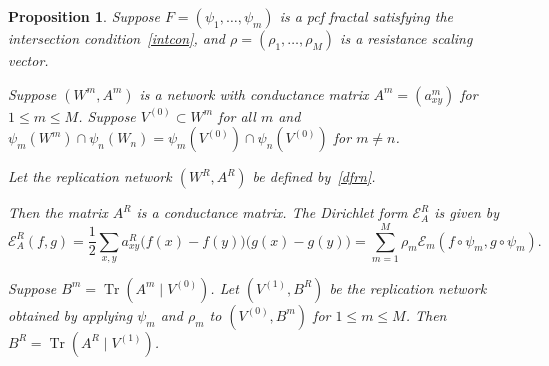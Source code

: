 \documentclass[a4paper]{amsart}
\theoremstyle{plain}
\newtheorem{proposition}[theorem]{Proposition}
\theoremstyle{definition}
\theoremstyle{remark}
\DeclareMathOperator{\Tr}{Tr}
\begin{document}
\begin{proposition} \label{proptr} Suppose $ F =(\psi_1,\dots, \psi_m) $ is a pcf fractal satisfying the intersection condition~\eqref{intcon}, and $ \rho = (\rho_1,\dots,\rho_M) $ is a resistance scaling vector.

Suppose   $ (W^m,A^m) $ is a network with conductance matrix $ A^m = (a^m_{xy}) $ for $ 1 \leq m \leq M $.
Suppose   $ V^{(0)} \subset W^m $ for all $ m $ and  $ \psi  _m (W^m) \cap \psi  _n (W_n) =  \psi  _m (V^{(0)}) \cap \psi  _n (V^{(0)}) $ for $ m\neq n $.
 
Let the replication network $ (W^R, A^R ) $ be defined  by~\eqref{dfrn}. 
 
Then the matrix $ A^R $ is a conductance matrix.  
The  Dirichlet form $ \mathcal{E}_A ^R $ is given by 
\begin{equation} \label{repm}
\mathcal{E} _A^R  (f,g)= \frac{1}{2} \sum_{x,y} a_{xy}^R\big(f(x) - f(y) \big) \big( g(x) - g(y) \big) 
= \sum_{m=1}^{M  } \rho_m \mathcal{E}_m (f \circ \psi_m , g \circ \psi_m  ) .
\end{equation} 


Suppose  $ B^m = \Tr(A^m\mid V^{(0)}) $. 
Let $ (V^{(1)},B^R) $ be the replication network obtained by applying $ \psi_m $ and $ \rho_m $ to $ (V^{(0)},B^m) $ for $ 1 \leq m \leq M $. Then $ B^R = \Tr(A^R\mid V^{(1)}) $.
\end{proposition} 
\end{document}
